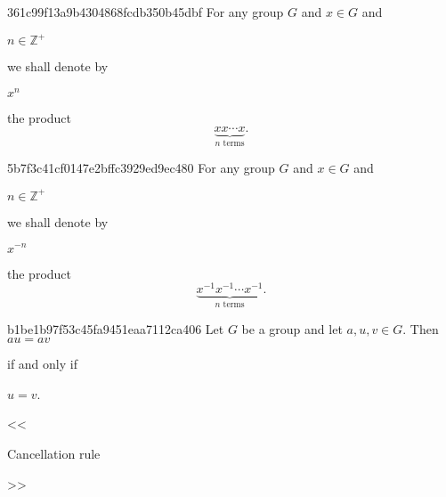 \begin{note}{361c99f13a9b4304868fcdb350b45dbf}
    For any group \({ G }\) and \({ x \in G }\) and \begin{icloze}{3}\({ n \in \mathbb Z^{+} }\)\end{icloze}
    we shall denote by \begin{icloze}{2}\({ x^{n} }\)\end{icloze}
    \begin{icloze}{1}
        the product
        \[
            \underbrace{x x \cdots x}_{\text{\({ n }\) terms}}.
        \]
    \end{icloze}
\end{note}

\begin{note}{5b7f3c41cf0147e2bffc3929ed9ec480}
    For any group \({ G }\) and \({ x \in G }\) and \begin{icloze}{3}\({ n \in \mathbb Z^{+} }\)\end{icloze}
    we shall denote by \begin{icloze}{2}\({ x^{-n} }\)\end{icloze}
    \begin{icloze}{1}
        the product
        \[
            \underbrace{x^{-1} x^{-1} \cdots x^{-1}}_{\text{\({ n }\) terms}}.
        \]
    \end{icloze}
\end{note}


\begin{note}{b1be1b97f53c45fa9451eaa7112ca406}
    Let \({ G }\) be a group and let \({ a, u, v \in G }\).
    Then \({ au = av }\) \begin{icloze}{2}if and only if\end{icloze} \begin{icloze}{1}\({ u = v }\).\end{icloze}

    \begin{center}
        \tiny
        <<\begin{icloze}{3}Cancellation rule\end{icloze}>>
    \end{center}
\end{note}


